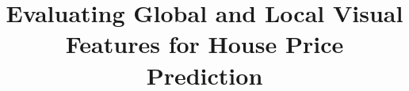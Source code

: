 \documentclass[conference,a4paper]{IEEEtran}
\title{Evaluating Global and Local Visual Features for House Price Prediction}
\author{\IEEEauthorblockN{\authornames}
\IEEEauthorblockA{\studentids\\
COMP90086 Computer Vision, The University of Melbourne}}
\begin{document}
\maketitle
\raggedbottom





\FloatBarrier


\end{document}
